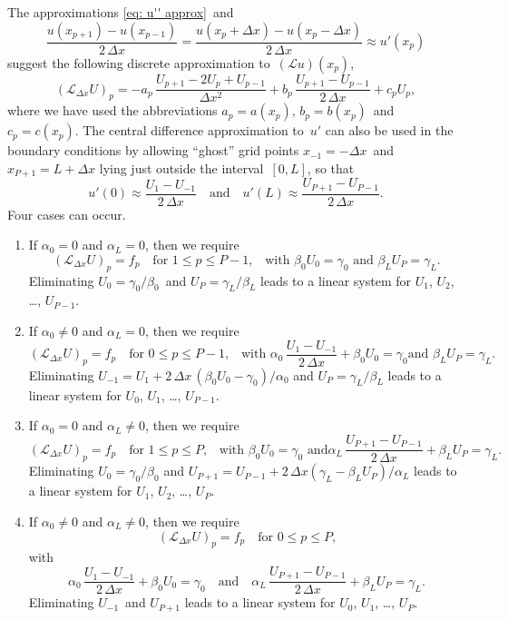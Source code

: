 The approximations \eqref{eq: u'' approx}~and
\begin{equation}\label{eq: u' approx}
\frac{u(x_{p+1})-u(x_{p-1})}{2\,\Delta x}
	=\frac{u(x_p+\Delta x)-u(x_p-\Delta x)}{2\,\Delta x}
	\approx u'(x_p)
\end{equation}
suggest the following discrete approximation to~$(\mathcal{L}u)(x_p)$, 
\begin{equation}\label{eq: Lu Delta x}
(\mathcal{L}_{\Delta x}U)_p=
-a_p\,\frac{U_{p+1}-2U_p+U_{p-1}}{\Delta x^2}
	+b_p\,\frac{U_{p+1}-U_{p-1}}{2\,\Delta x}+c_pU_p,
\end{equation}
where we have used the abbreviations $a_p=a(x_p)$, $b_p=b(x_p)$~and 
$c_p=c(x_p)$.  The central difference approximation to~$u'$ can also be used 
in the boundary conditions by allowing ``ghost'' grid points $x_{-1}=-\Delta 
x$~and $x_{P+1}=L+\Delta x$ lying just outside the interval~$[0,L]$, so that
\begin{equation}\label{eq: bc ghost points}
u'(0)\approx\frac{U_1-U_{-1}}{2\,\Delta x}
\quad\text{and}\quad
u'(L)\approx\frac{U_{P+1}-U_{P-1}}{2\,\Delta x}.
\end{equation}
Four cases can occur.
\begin{enumerate}
\item If $\alpha_0=0$ and $\alpha_L=0$, then we require
\[
(\mathcal{L}_{\Delta x}U)_p=f_p\quad\text{for $1\le p\le P-1$,}\quad
\text{with $\beta_0U_0=\gamma_0$ and $\beta_LU_P=\gamma_L$.}
\]
Eliminating $U_0=\gamma_0/\beta_0$~and $U_P=\gamma_L/\beta_L$ leads to a linear 
system for $U_1$, $U_2$, \dots, $U_{P-1}$.
\item If $\alpha_0\ne0$ and $\alpha_L=0$, then we require
\[
(\mathcal{L}_{\Delta x}U)_p=f_p\quad\text{for $0\le p\le P-1$,}\quad
\text{with $\alpha_0\,\frac{U_1-U_{-1}}{2\,\Delta x}+\beta_0U_0=\gamma_0$
and $\beta_LU_P=\gamma_L$.}
\]
Eliminating $U_{-1}=U_1+2\,\Delta x\,(\beta_0U_0-\gamma_0)/\alpha_0$ and 
$U_P=\gamma_L/\beta_L$ leads to a linear system for $U_0$, $U_1$, \dots, 
$U_{P-1}$.
\item If $\alpha_0=0$ and $\alpha_L\ne0$, then we require
\[
(\mathcal{L}_{\Delta x}U)_p=f_p\quad\text{for $1\le p\le P$,}\quad
\text{with $\beta_0U_0=\gamma_0$ and
$\alpha_L\,\frac{U_{P+1}-U_{P-1}}{2\,\Delta x}+\beta_LU_P=\gamma_L$.}
\]
Eliminating $U_0=\gamma_0/\beta_0$ and
$U_{P+1}=U_{P-1}+2\,\Delta x(\gamma_L-\beta_LU_P)/\alpha_L$ leads to a linear 
system for $U_1$, $U_2$, \dots, $U_P$.
\item If $\alpha_0\ne0$ and $\alpha_L\ne0$, then we require
\[
(\mathcal{L}_{\Delta x}U)_p=f_p\quad\text{for $0\le p\le P$,}
\]
with
\[
\alpha_0\,\frac{U_1-U_{-1}}{2\,\Delta x}+\beta_0U_0=\gamma_0
\quad\text{and}\quad
\alpha_L\,\frac{U_{P+1}-U_{P-1}}{2\,\Delta x}+\beta_LU_P=\gamma_L.
\]
Eliminating $U_{-1}$~and $U_{P+1}$ leads to a linear system for
$U_0$, $U_1$, \dots, $U_P$.
\end{enumerate}

